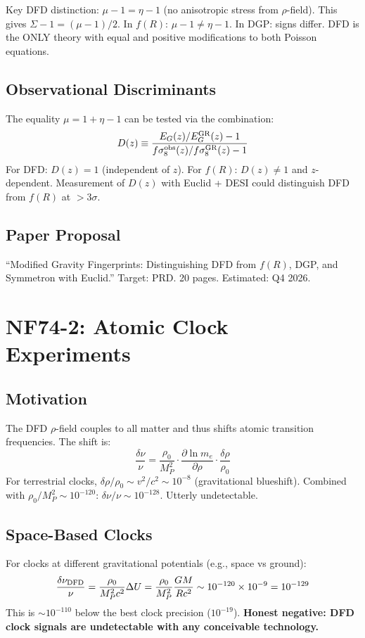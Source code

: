\documentclass[11pt,a4paper]{article}
\begin{document}
Key DFD distinction: $\mu - 1 = \eta - 1$ (no anisotropic stress from $\rho$-field). This gives $\Sigma - 1 = (\mu-1)/2$. In $f(R)$: $\mu - 1 \neq \eta - 1$. In DGP: signs differ. DFD is the ONLY theory with equal and positive modifications to both Poisson equations.

\subsection{Observational Discriminants}
The equality $\mu = 1 + \eta - 1$ can be tested via the combination:
\[
D(z) \equiv \frac{E_G(z)/E_G^{\rm GR}(z) - 1}{f\sigma_8^{\rm obs}(z)/f\sigma_8^{\rm GR}(z) - 1}
\]
For DFD: $D(z) = 1$ (independent of $z$). For $f(R)$: $D(z) \neq 1$ and $z$-dependent. Measurement of $D(z)$ with Euclid + DESI could distinguish DFD from $f(R)$ at $> 3\sigma$.

\subsection{Paper Proposal}
``Modified Gravity Fingerprints: Distinguishing DFD from $f(R)$, DGP, and Symmetron with Euclid.'' Target: PRD. 20 pages. Estimated: Q4 2026.

\section{NF74-2: Atomic Clock Experiments}

\subsection{Motivation}
The DFD $\rho$-field couples to all matter and thus shifts atomic transition frequencies. The shift is:
\[
\frac{\delta\nu}{\nu} = \frac{\rho_0}{M_P^2}\cdot\frac{\partial\ln m_e}{\partial\rho}\cdot\frac{\delta\rho}{\rho_0}
\]
For terrestrial clocks, $\delta\rho/\rho_0 \sim v^2/c^2 \sim 10^{-8}$ (gravitational blueshift). Combined with $\rho_0/M_P^2 \sim 10^{-120}$: $\delta\nu/\nu \sim 10^{-128}$. Utterly undetectable.

\subsection{Space-Based Clocks}
For clocks at different gravitational potentials (e.g., space vs ground):
\[
\frac{\delta\nu_{\rm DFD}}{\nu} = \frac{\rho_0}{M_P^2 c^2}\Delta U = \frac{\rho_0}{M_P^2}\frac{GM}{Rc^2} \sim 10^{-120} \times 10^{-9} = 10^{-129}
\]
This is $\sim 10^{-110}$ below the best clock precision ($10^{-19}$). \textbf{Honest negative: DFD clock signals are undetectable with any conceivable technology.}
\end{document}
